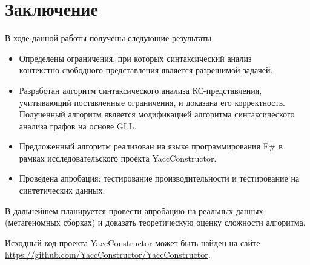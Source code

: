 \section*{Заключение}

В ходе данной работы получены следующие результаты.

\begin{itemize}
	\item Определены ограничения, при которых синтаксический анализ \\ контекстно-свободного представления является разрешимой задачей.
	\item Разработан алгоритм синтаксического анализа КС-представления, учитывающий поставленные ограничения, и доказана его корректность. Полученный алгоритм является модификацией алгоритма синтаксического анализа графов на основе GLL.
	\item Предложенный алгоритм реализован на языке программирования F$\#$ в рамках исследовательского проекта YaccConstructor.
	\item Проведена апробация: тестирование производительности и тестирование на синтетических данных.
\end{itemize}  

В дальнейшем планируется провести апробацию на реальных данных (метагеномных сборках) и доказать теоретическую оценку сложности алгоритма.

Исходный код проекта YaccConstructor может быть найден на сайте \url{https://github.com/YaccConstructor/YaccConstructor}. 